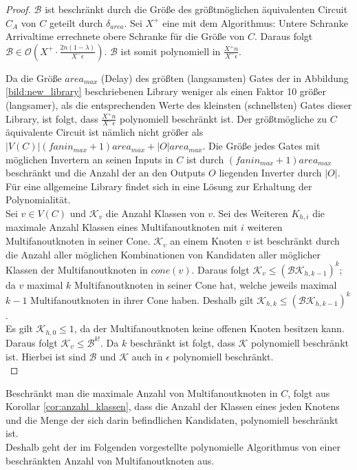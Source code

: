 \documentclass[11pt, a4paper, german]{article}
\begin{document}
\begin{proof}
$\mathcal{B}$ ist beschränkt durch die Größe des größtmöglichen äquivalenten Circuit $C_A$ von $C$ geteilt durch $\delta_{area}$. Sei $X^+$ eine mit dem Algorithmus: Untere Schranke Arrivaltime errechnete obere Schranke für die Größe von $C$. Daraus folgt $\mathcal{B} \in \mathcal{O}(X^+ \cdot \frac{2n(1-\lambda)}{X^- \epsilon})$. $\mathcal{B} $ ist somit polynomiell in $\frac{X^+ n}{X^- \epsilon}$. 



Da die Größe $area_{max}$ (Delay) des größten (langsamsten) Gates der in Abbildung \ref{bild:new_library} beschriebenen Library weniger als einen Faktor 10 größer (langsamer), als die entsprechenden Werte des kleinsten (schnellsten) Gates dieser Library, ist folgt, dass $\frac{X^+ n}{X^- \epsilon}$ polynomiell beschränkt ist.  Der größtmögliche zu $C$ äquivalente Circuit ist nämlich nicht größer als $|V(C)|(fanin_{max}+1)area_{max} + |O|area_{max}$. Die Größe jedes Gates mit möglichen Invertern an seinen Inputs in $C$ ist durch $(fanin_{max}+1)area_{max}$ beschränkt und die Anzahl der an den Outputs $O$ liegenden Inverter durch $|O|$.\\
Für eine allgemeine Library findet sich in \cite{Elbert} eine Lösung zur Erhaltung der Polynomialität.\\
Sei $v \in V(C)$ und $\mathcal{K}_v$ die Anzahl Klassen von $v$. Sei des Weiteren $K_{h,i}$ die maximale Anzahl Klassen eines Multifanoutknoten mit $i$ weiteren Multifanoutknoten in seiner Cone. 
$\mathcal{K}_v$ an einem Knoten $v$ ist beschränkt durch die Anzahl aller möglichen Kombinationen von Kandidaten aller möglicher Klassen der Multifanoutknoten in $cone(v)$. Daraus folgt $\mathcal{K}_v \leq (\mathcal{BK}_{h,k-1})^k$; da $v$ maximal $k$ Multifanoutknoten in seiner Cone hat, welche jeweils maximal $k-1$ Multifanoutknoten in ihrer Cone haben. Deshalb gilt $\mathcal{K}_{h,k} \leq (\mathcal{BK}_{h,k-1})^k$.\\
Es gilt $\mathcal{K}_{h,0} \leq 1$, da der Multifanoutknoten keine offenen Knoten besitzen kann. \\
Daraus folgt $\mathcal{K}_v \leq \mathcal{B}^{k!}$. Da $k$ beschränkt ist folgt, dass $\mathcal{K}$ polynomiell beschränkt ist. Hierbei ist sind $\mathcal{B}$ und $\mathcal{K}$ auch in $\epsilon$ polynomiell beschränkt. \\
\end{proof}

Beschränkt man die maximale Anzahl von Multifanoutknoten in $C$, folgt aus Korollar \ref{cor:anzahl_klassen}, dass die Anzahl der Klassen eines jeden Knotens und die Menge der sich darin befindlichen Kandidaten, polynomiell beschränkt ist. \\
Deshalb geht der im Folgenden vorgestellte polynomielle Algorithmus von einer beschränkten Anzahl von Multifanoutknoten aus.\\ 
\end{document}

